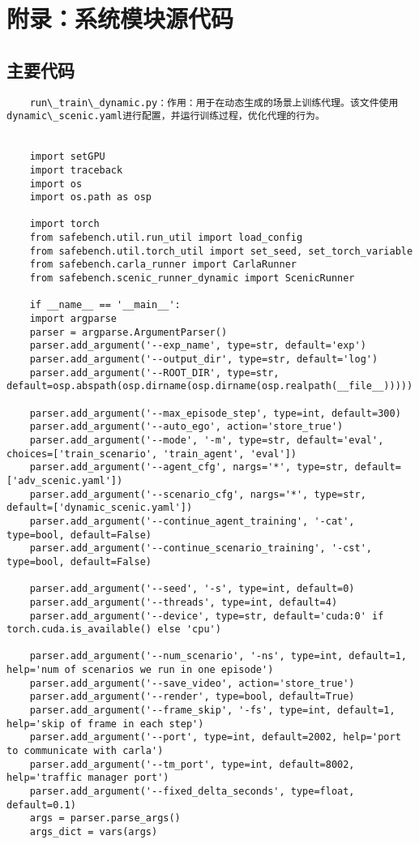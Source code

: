\chapter{附录：系统模块源代码}

\section{主要代码}
\begin{lstlisting}
	run\_train\_dynamic.py：作用：用于在动态生成的场景上训练代理。该文件使用dynamic\_scenic.yaml进行配置，并运行训练过程，优化代理的行为。
	
	
	import setGPU
	import traceback
	import os
	import os.path as osp
	
	import torch 
	from safebench.util.run_util import load_config
	from safebench.util.torch_util import set_seed, set_torch_variable
	from safebench.carla_runner import CarlaRunner
	from safebench.scenic_runner_dynamic import ScenicRunner
	
	if __name__ == '__main__':
	import argparse
	parser = argparse.ArgumentParser()
	parser.add_argument('--exp_name', type=str, default='exp')
	parser.add_argument('--output_dir', type=str, default='log')
	parser.add_argument('--ROOT_DIR', type=str, default=osp.abspath(osp.dirname(osp.dirname(osp.realpath(__file__)))))
	
	parser.add_argument('--max_episode_step', type=int, default=300)
	parser.add_argument('--auto_ego', action='store_true')
	parser.add_argument('--mode', '-m', type=str, default='eval', choices=['train_scenario', 'train_agent', 'eval'])
	parser.add_argument('--agent_cfg', nargs='*', type=str, default=['adv_scenic.yaml'])
	parser.add_argument('--scenario_cfg', nargs='*', type=str, default=['dynamic_scenic.yaml'])
	parser.add_argument('--continue_agent_training', '-cat', type=bool, default=False)
	parser.add_argument('--continue_scenario_training', '-cst', type=bool, default=False)
	
	parser.add_argument('--seed', '-s', type=int, default=0)
	parser.add_argument('--threads', type=int, default=4)
	parser.add_argument('--device', type=str, default='cuda:0' if torch.cuda.is_available() else 'cpu')   
	
	parser.add_argument('--num_scenario', '-ns', type=int, default=1, help='num of scenarios we run in one episode')
	parser.add_argument('--save_video', action='store_true')
	parser.add_argument('--render', type=bool, default=True)
	parser.add_argument('--frame_skip', '-fs', type=int, default=1, help='skip of frame in each step')
	parser.add_argument('--port', type=int, default=2002, help='port to communicate with carla')
	parser.add_argument('--tm_port', type=int, default=8002, help='traffic manager port')
	parser.add_argument('--fixed_delta_seconds', type=float, default=0.1)
	args = parser.parse_args()
	args_dict = vars(args)
	

\end{lstlisting}
